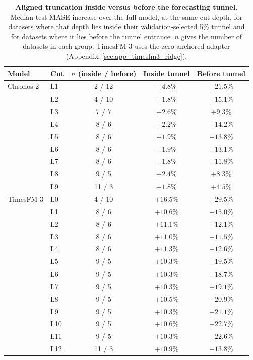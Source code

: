 \documentclass{article} %
\begin{document}
\begin{table}[p]
\centering
\caption{\textbf{Aligned truncation inside versus before the forecasting tunnel.} Median test MASE
increase over the full model, at the same cut depth, for datasets where that depth lies inside
their validation-selected 5\% tunnel and for datasets where it lies before the tunnel entrance.
$n$ gives the number of datasets in each group. TimesFM-3 uses the zero-anchored adapter
(Appendix~\ref{sec:app_timesfm3_ridge}).}
\vspace{4pt}
\label{tab:h4_tunnel_strata}
\small
\setlength{\tabcolsep}{5pt}
\begin{tabular}{@{}llccc@{}}
\toprule
Model & Cut & $n$ (inside / before) & Inside tunnel & Before tunnel \\
\midrule
Chronos-2 & L1 & 2 / 12 & $+4.8\%$ & $+21.5\%$ \\
 & L2 & 4 / 10 & $+1.8\%$ & $+15.1\%$ \\
 & L3 & 7 / 7 & $+2.6\%$ & $+9.3\%$ \\
 & L4 & 8 / 6 & $+2.2\%$ & $+14.2\%$ \\
 & L5 & 8 / 6 & $+1.9\%$ & $+13.8\%$ \\
 & L6 & 8 / 6 & $+1.9\%$ & $+13.1\%$ \\
 & L7 & 8 / 6 & $+1.8\%$ & $+11.8\%$ \\
 & L8 & 9 / 5 & $+2.4\%$ & $+8.3\%$ \\
 & L9 & 11 / 3 & $+1.8\%$ & $+4.5\%$ \\
\midrule
TimesFM-3 & L0 & 4 / 10 & $+16.5\%$ & $+29.5\%$ \\
 & L1 & 8 / 6 & $+10.6\%$ & $+15.0\%$ \\
 & L2 & 8 / 6 & $+11.1\%$ & $+12.1\%$ \\
 & L3 & 8 / 6 & $+11.0\%$ & $+11.5\%$ \\
 & L4 & 8 / 6 & $+11.3\%$ & $+12.6\%$ \\
 & L5 & 9 / 5 & $+10.3\%$ & $+19.5\%$ \\
 & L6 & 9 / 5 & $+10.3\%$ & $+18.7\%$ \\
 & L7 & 9 / 5 & $+10.3\%$ & $+19.1\%$ \\
 & L8 & 9 / 5 & $+10.5\%$ & $+20.9\%$ \\
 & L9 & 9 / 5 & $+10.3\%$ & $+21.1\%$ \\
 & L10 & 9 / 5 & $+10.6\%$ & $+22.7\%$ \\
 & L11 & 9 / 5 & $+10.3\%$ & $+22.6\%$ \\
 & L12 & 11 / 3 & $+10.9\%$ & $+13.8\%$ \\

\end{tabular}
\end{table}
\end{document}
